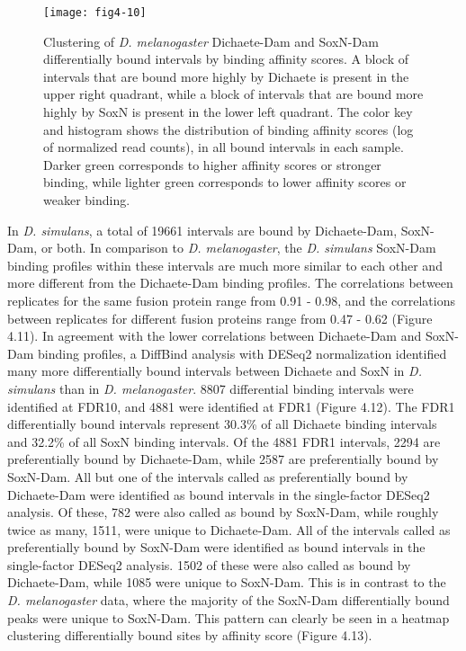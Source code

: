 \begin{figure}
\centering
\texttt{[image: fig4-10]}
\caption[Clustering of \emph{D. melanogaster} Dichaete-Dam and SoxN-Dam differentially bound intervals by binding affinity scores]{Clustering of \emph{D. melanogaster} Dichaete-Dam and SoxN-Dam differentially bound intervals by binding affinity scores. A block of intervals that are bound more highly by Dichaete is present in the upper right quadrant, while a block of intervals that are bound more highly by SoxN is present in the lower left quadrant. The color key and histogram shows the distribution of binding affinity scores (log of normalized read counts), in all bound intervals in each sample. Darker green corresponds to higher affinity scores or stronger binding, while lighter green corresponds to lower affinity scores or weaker binding.}
\label{Figure 4.10}
\end{figure}

In \emph{D. simulans}, a total of 19661 intervals are bound by Dichaete-Dam, SoxN-Dam, or both. In comparison to \emph{D. melanogaster}, the \emph{D. simulans} SoxN-Dam binding profiles within these intervals are much more similar to each other and more different from the Dichaete-Dam binding profiles. The correlations between replicates for the same fusion protein range from 0.91 - 0.98, and the correlations between replicates for different fusion proteins range from 0.47 - 0.62 (Figure 4.11). In agreement with the lower correlations between Dichaete-Dam and SoxN-Dam binding profiles, a DiffBind analysis with DESeq2 normalization identified many more differentially bound intervals between Dichaete and SoxN in \emph{D. simulans} than in \emph{D. melanogaster}. 8807 differential binding intervals were identified at FDR10, and 4881 were identified at FDR1 (Figure 4.12). The FDR1 differentially bound intervals represent 30.3\% of all Dichaete binding intervals and 32.2\% of all SoxN binding intervals. Of the 4881 FDR1 intervals, 2294 are preferentially bound by Dichaete-Dam, while 2587 are preferentially bound by SoxN-Dam. All but one of the intervals called as preferentially bound by Dichaete-Dam were identified as bound intervals in the single-factor DESeq2 analysis. Of these, 782 were also called as bound by SoxN-Dam, while roughly twice as many, 1511, were unique to Dichaete-Dam. All of the intervals called as preferentially bound by SoxN-Dam were identified as bound intervals in the single-factor DESeq2 analysis. 1502 of these were also called as bound by Dichaete-Dam, while 1085 were unique to SoxN-Dam. This is in contrast to the \emph{D. melanogaster} data, where the majority of the SoxN-Dam differentially bound peaks were unique to SoxN-Dam. This pattern can clearly be seen in a heatmap clustering differentially bound sites by affinity score (Figure 4.13).

